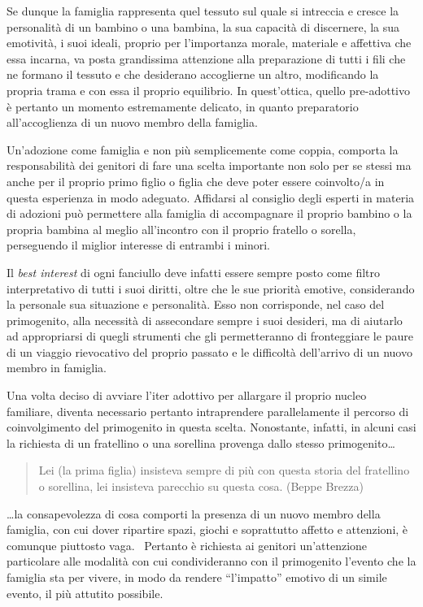 \documentclass[12pt,oneside,svgnames]{memoir}
\newenvironment{quotationb}%
{\color{maincolor}\begin{leftbar}\begin{quotation}}%
{\end{quotation}\end{leftbar}\ignorespacesafterend}
\begin{document}
Se dunque la famiglia rappresenta quel tessuto sul quale si intreccia e
cresce la personalità di un bambino o una bambina, la sua capacità di
discernere, la sua emotività, i suoi ideali, proprio per l'importanza
morale, materiale e affettiva che essa incarna, va posta grandissima
attenzione alla preparazione di tutti i fili che ne formano il tessuto e
che desiderano accoglierne un altro, modificando la propria trama e con
essa il proprio equilibrio. In quest'ottica, quello pre-adottivo è
pertanto un momento estremamente delicato, in quanto preparatorio
all'accoglienza di un nuovo membro della famiglia.

Un'adozione come famiglia e non più semplicemente come coppia, comporta
la responsabilità dei genitori di fare una scelta importante non solo
per se stessi ma anche per il proprio primo figlio o figlia che deve
poter essere coinvolto/a in questa esperienza in modo adeguato.
Affidarsi al consiglio degli esperti in materia di adozioni può
permettere alla famiglia di accompagnare il proprio bambino o la propria
bambina al meglio all'incontro con il proprio fratello o sorella,
perseguendo il miglior interesse di entrambi i minori.

Il \emph{best interest} di ogni fanciullo deve infatti essere sempre
posto come filtro interpretativo di tutti i suoi diritti, oltre che le
sue priorità emotive, considerando la personale sua situazione e
personalità. Esso non corrisponde, nel caso del primogenito, alla
necessità di assecondare sempre i suoi desideri, ma di aiutarlo ad
appropriarsi di quegli strumenti che gli permetteranno di fronteggiare
le paure di un viaggio rievocativo del proprio passato e le difficoltà
dell'arrivo di un nuovo membro in famiglia.

Una volta deciso di avviare l'iter adottivo per allargare il proprio
nucleo familiare, diventa necessario pertanto intraprendere
parallelamente il percorso di coinvolgimento del primogenito in questa
scelta. Nonostante, infatti, in alcuni casi la richiesta di un
fratellino o una sorellina provenga dallo stesso primogenito\ldots{}

\begin{quotationb}
Lei (la prima figlia) insisteva sempre di più con questa storia del
fratellino o sorellina, lei insisteva parecchio su questa cosa. (Beppe
Brezza)
\end{quotationb}

\ldots{}la consapevolezza di cosa comporti la presenza di un nuovo
membro della famiglia, con cui dover ripartire spazi, giochi e
soprattutto affetto e attenzioni, è comunque piuttosto vaga. ~Pertanto è
richiesta ai genitori un'attenzione particolare alle modalità con cui
condivideranno con il primogenito l'evento che la famiglia sta per
vivere, in modo da rendere ``l'impatto'' emotivo di un simile evento, il
più attutito possibile.
\end{document}
